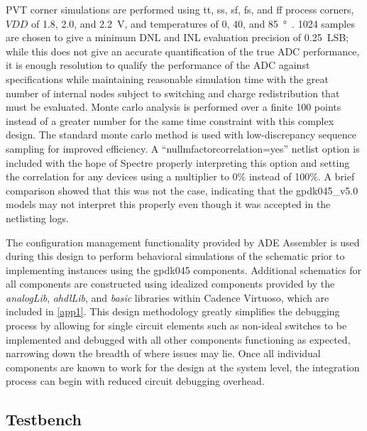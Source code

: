 \documentclass[11pt,letterpaper]{article}
\begin{document}
PVT corner simulations are performed using tt, ss, sf, fs, and ff process corners, \(VDD\) of 1.8, 2.0, and \qty{2.2}{V}, and temperatures of 0, 40, and \qty{85}{\degree\C}. 1024 samples are chosen to give a minimum DNL and INL evaluation precision of \qty{0.25}{LSB}; while this does not give an accurate quantification of the true ADC performance, it is enough resolution to qualify the performance of the ADC against specifications while maintaining reasonable simulation time with the great number of internal nodes subject to switching and charge redistribution that must be evaluated. Monte carlo analysis is performed over a finite 100 points instead of a greater number for the same time constraint with this complex design. The standard monte carlo method is used with low-discrepancy sequence sampling for improved efficiency. A ``nullmfactorcorrelation=yes'' netlist option is included with the hope of Spectre properly interpreting this option and setting the correlation for any devices using a multiplier to 0\% instead of 100\%. A brief comparison showed that this was not the case, indicating that the gpdk045\_v5.0 models may not interpret this properly even though it was accepted in the netlisting logs.

The configuration management functionality provided by ADE Assembler is used during this design to perform behavioral simulations of the schematic prior to implementing instances using the gpdk045 components. Additional schematics for all components are constructed using idealized components provided by the \emph{analogLib}, \emph{ahdlLib}, and \emph{basic} libraries within Cadence Virtuoso, which are included in \cref{app1}. This design methodology greatly simplifies the debugging process by allowing for single circuit elements such as non-ideal switches to be implemented and debugged with all other components functioning as expected, narrowing down the breadth of where issues may lie. Once all individual components are known to work for the design at the system level, the integration process can begin with reduced circuit debugging overhead. 

\subsection{Testbench}
\end{document}
